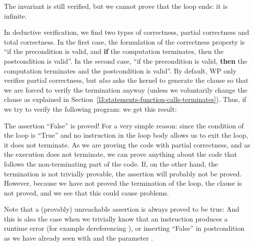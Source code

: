 The invariant is still verified, but we cannot prove that the loop ends:
it is infinite.



\label{l3:statements-loops-variant}


In deductive verification, we find two types of correctness, partial
correctness and total correctness. In the first case, the
formulation of the correctness property is ``if the precondition is
valid, and \textbf{if} the computation terminates, then the
postcondition is valid''. In the second case, ``if the precondition is
valid, \textbf{then} the computation terminates and the postcondition is
valid''. By default, WP only verifies partial correctness, but \textit{also} asks
the kernel to generate the  clause so that we are forced
to verify the termination anyway (unless we voluntarily change the clause
as explained in Section~\ref{l3:statements-function-calls-terminates}). Thus,
if we try to verify the following program:
we get this result:



The assertion ``False'' is proved! For a very simple reason: since the
condition of the loop is ``True'' and no instruction in the loop body
allows us to exit the loop, it does not terminate. As we are proving the
code with partial correctness, and as the execution does not terminate,
we can prove anything about the code that follows the non-terminating
part of the code. If, on the other hand, the termination is not trivially provable,
the assertion will probably not be proved. However, because we have not proved
the termination of the loop, the  clause is not proved,
and we see that this could cause problems.



\begin{Information}
  Note that a (provably) unreachable assertion is always proved to be true:
  And this is also the case when we trivially know that an instruction
  produces a runtime error (for example dereferencing ), or
  inserting ``False'' in postcondition as we have already seen with
   and the parameter .
\end{Information}


\label{l4:statements-loops-variant-measure}


